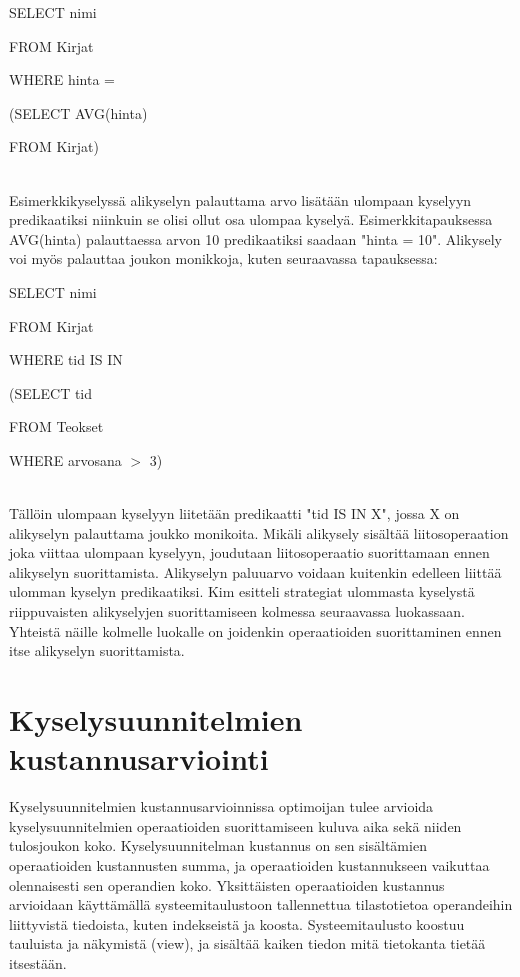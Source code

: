 \documentclass[finnish]{tktltiki2}
\theoremstyle{definition}
\theoremstyle{remark}
\begin{document}
\begin{frame}

SELECT nimi

FROM Kirjat

WHERE hinta = 

\hspace*{5mm}(SELECT AVG(hinta)
		
\hspace*{5mm}FROM Kirjat)
\end{frame}
\\\newline
Esimerkkikyselyssä alikyselyn palauttama arvo lisätään ulompaan kyselyyn predikaatiksi niinkuin se olisi ollut osa ulompaa kyselyä. Esimerkkitapauksessa AVG(hinta) palauttaessa arvon 10 predikaatiksi saadaan "hinta = 10". Alikysely voi myös palauttaa joukon monikkoja, kuten seuraavassa tapauksessa:
\newline

\begin{frame}

SELECT nimi

FROM Kirjat

WHERE tid IS IN 

\hspace*{5mm}(SELECT tid
		
\hspace*{5mm}FROM Teokset

\hspace*{5mm}WHERE arvosana $>$ 3)
\end{frame}
\\\newline
Tällöin ulompaan kyselyyn liitetään predikaatti "tid IS IN X", jossa X on alikyselyn palauttama joukko monikoita. Mikäli alikysely sisältää liitosoperaation joka viittaa ulompaan kyselyyn, joudutaan liitosoperaatio suorittamaan ennen alikyselyn suorittamista. Alikyselyn paluuarvo voidaan kuitenkin edelleen liittää ulomman kyselyn predikaatiksi. Kim esitteli strategiat ulommasta kyselystä riippuvaisten alikyselyjen suorittamiseen kolmessa seuraavassa luokassaan. Yhteistä näille kolmelle luokalle on joidenkin operaatioiden suorittaminen ennen itse alikyselyn suorittamista.


\section{Kyselysuunnitelmien kustannusarviointi}
Kyselysuunnitelmien kustannusarvioinnissa optimoijan tulee arvioida kyselysuunnitelmien operaatioiden suorittamiseen kuluva aika sekä niiden tulosjoukon koko. Kyselysuunnitelman kustannus on sen sisältämien operaatioiden kustannusten summa, ja operaatioiden kustannukseen vaikuttaa olennaisesti sen operandien koko. Yksittäisten operaatioiden kustannus arvioidaan käyttämällä systeemitaulustoon tallennettua tilastotietoa operandeihin liittyvistä tiedoista, kuten indekseistä ja koosta. Systeemitaulusto koostuu tauluista ja näkymistä (view), ja sisältää kaiken tiedon mitä tietokanta tietää itsestään.
\end{document}
